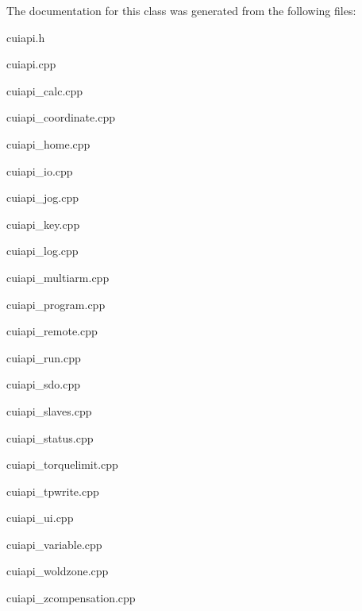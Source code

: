 The documentation for this class was generated from the following files\-:\begin{DoxyCompactItemize}
\item 
cuiapi.\-h\item 
cuiapi.\-cpp\item 
cuiapi\-\_\-calc.\-cpp\item 
cuiapi\-\_\-coordinate.\-cpp\item 
cuiapi\-\_\-home.\-cpp\item 
cuiapi\-\_\-io.\-cpp\item 
cuiapi\-\_\-jog.\-cpp\item 
cuiapi\-\_\-key.\-cpp\item 
cuiapi\-\_\-log.\-cpp\item 
cuiapi\-\_\-multiarm.\-cpp\item 
cuiapi\-\_\-program.\-cpp\item 
cuiapi\-\_\-remote.\-cpp\item 
cuiapi\-\_\-run.\-cpp\item 
cuiapi\-\_\-sdo.\-cpp\item 
cuiapi\-\_\-slaves.\-cpp\item 
cuiapi\-\_\-status.\-cpp\item 
cuiapi\-\_\-torquelimit.\-cpp\item 
cuiapi\-\_\-tpwrite.\-cpp\item 
cuiapi\-\_\-ui.\-cpp\item 
cuiapi\-\_\-variable.\-cpp\item 
cuiapi\-\_\-woldzone.\-cpp\item 
cuiapi\-\_\-zcompensation.\-cpp\end{DoxyCompactItemize}
